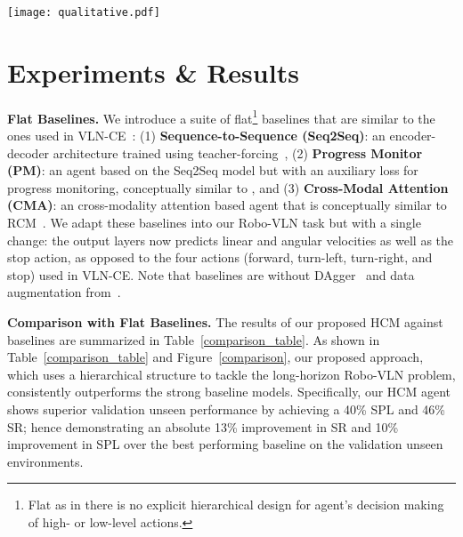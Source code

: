 \documentclass[letter, 10pt, conference]{ieeeconf}
\begin{document}
\begin{figure*}[htp]
\centering
\texttt{[image: qualitative.pdf]}
\label{qualitative}
\end{figure*}

\section{Experiments \& Results} \label{experiments}
\textbf{Flat Baselines.}\label{baselines}
We introduce a suite of flat\footnote{Flat as in there is no explicit hierarchical design for agent's decision making of high- or low-level actions.} baselines that are similar to the ones used in VLN-CE~\cite{krantz2020navgraph}:
(1) \textbf{Sequence-to-Sequence (Seq2Seq)}: an encoder-decoder architecture trained using teacher-forcing~\cite{mattersim},
(2) \textbf{Progress Monitor (PM)}: an agent based on the Seq2Seq model but with an auxiliary loss for progress monitoring, conceptually similar to \cite{ma2019selfmonitoring}, and 
(3) \textbf{Cross-Modal Attention (CMA)}: an cross-modality attention based agent that is conceptually similar to RCM~\cite{wang2019reinforced}.
We adapt these baselines into our Robo-VLN task but with a single change: the output layers now predicts linear and angular velocities as well as the stop action, as opposed to the four actions (forward, turn-left, turn-right, and stop) used in VLN-CE.
Note that baselines are without DAgger~\cite{ross2011reduction} and data augmentation from~\cite{tan2019learning}.

\textbf{Comparison with Flat Baselines.}
The results of our proposed HCM against baselines are summarized in Table~\ref{comparison_table}. As shown in Table~\ref{comparison_table} and Figure~\ref{comparison}, 
our proposed approach, which uses a hierarchical structure to tackle the long-horizon Robo-VLN problem, consistently outperforms the strong baseline models.  
Specifically, our HCM agent shows superior validation unseen performance by achieving a 40\% SPL and 46\% SR; hence demonstrating an absolute 13\% improvement in SR and 10\% improvement in SPL over the best performing baseline on the validation unseen environments.  
\end{document}
